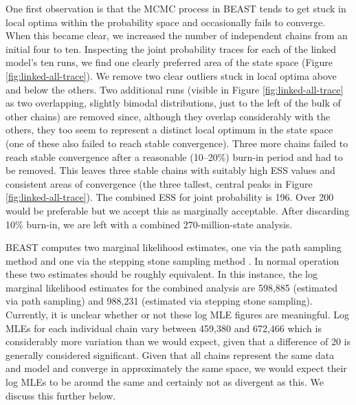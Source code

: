 One first observation is that the MCMC process in BEAST tends to get stuck in local optima within the probability space and occasionally fails to converge. When this became clear, we increased the number of independent chains from an initial four to ten. Inspecting the joint probability traces for each of the linked model's ten runs, we find one clearly preferred area of the state space (Figure \ref{fig:linked-all-trace}). We remove two clear outliers stuck in local optima above and below the others. Two additional runs (visible in Figure \ref{fig:linked-all-trace} as two overlapping, slightly bimodal distributions, just to the left of the bulk of other chains) are removed since, although they overlap considerably with the others, they too seem to represent a distinct local optimum in the state space (one of these also failed to reach stable convergence). Three more chains failed to reach stable convergence after a reasonable (10--20\%) burn-in period and had to be removed. This leaves three stable chains with suitably high ESS values and consistent areas of convergence (the three tallest, central peaks in Figure \ref{fig:linked-all-trace}). The combined ESS for joint probability is 196. Over 200 would be preferable but we accept this as marginally acceptable. After discarding 10\% burn-in, we are left with a combined 270-million-state analysis.

BEAST computes two marginal likelihood estimates, one via the path sampling method \autocite{baele_improving_2012} and one via the stepping stone sampling method \autocite{baele_accurate_2013}. In normal operation these two estimates should be roughly equivalent. In this instance, the log marginal likelihood estimates for the combined analysis are 598,885 (estimated via path sampling) and 988,231 (estimated via stepping stone sampling). Currently, it is unclear whether or not these log MLE figures are meaningful. Log MLEs for each individual chain vary between 459,380 and 672,466 which is considerably more variation than we would expect, given that a difference of 20 is generally considered significant. Given that all chains represent the same data and model and converge in approximately the same space, we would expect their log MLEs to be around the same and certainly not as divergent as this. We discuss this further below.

